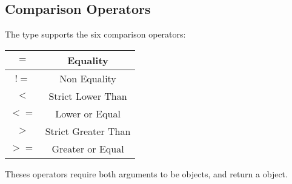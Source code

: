 \subsection{Comparison Operators}

The  type supports the six comparison operators:

\begin{tabular}{|c|c|}
\hline
$=$ & Equality \\
\hline
$!=$ & Non Equality \\
\hline
$<$  & Strict Lower Than \\
\hline
$<=$  & Lower or Equal \\
\hline
$>$  & Strict Greater Than \\
\hline
$>=$  & Greater or Equal \\
\hline
\end{tabular}

Theses operators require both arguments to be  objects, and return a  object.
